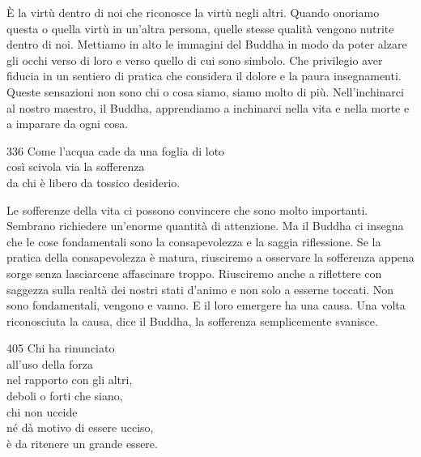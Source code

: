 \begin{dhpRefl}
\`{E} la virtù dentro di noi che riconosce la virtù negli altri. Quando onoriamo questa o quella virtù in un'altra persona, quelle stesse qualit\`{a} vengono nutrite dentro di noi. Mettiamo in alto le immagini del Buddha in modo da poter alzare gli occhi verso di loro e verso quello di cui sono simbolo. Che privilegio aver fiducia in un sentiero di pratica che considera il dolore e la paura insegnamenti. Queste sensazioni non sono chi o cosa siamo, siamo molto di più. Nell'inchinarci al nostro maestro, il Buddha, apprendiamo a inchinarci nella vita e nella morte e a imparare da ogni cosa.
\end{dhpRefl}


\begin{dhpVerse}{336}
\label{dhp-336}
Come l'acqua cade da una foglia di loto\\
così scivola via la sofferenza\\
da chi \`{e} libero da tossico desiderio.
\end{dhpVerse}

\begin{dhpRefl}
Le sofferenze della vita ci possono convincere che sono molto importanti. Sembrano richiedere un'enorme quantit\`{a} di attenzione. Ma il Buddha ci insegna che le cose fondamentali sono la consapevolezza e la saggia riflessione. Se la pratica della consapevolezza \`{e} matura, riusciremo a osservare la sofferenza appena sorge senza lasciarcene affascinare troppo. Riusciremo anche a riflettere con saggezza sulla realt\`{a} dei nostri stati d'animo e non solo a esserne toccati. Non sono fondamentali, vengono e vanno. E il loro emergere ha una causa. Una volta riconosciuta la causa, dice il Buddha, la sofferenza semplicemente svanisce. 
\end{dhpRefl}


\begin{dhpVerse}{405}
\label{dhp-405}
Chi ha rinunciato\\
all'uso della forza\\
nel rapporto con gli altri,\\
deboli o forti che siano,\\
chi non uccide\\
n\'{e} d\`{a} motivo di essere ucciso,\\
\`{e} da ritenere un grande essere.
\end{dhpVerse}

